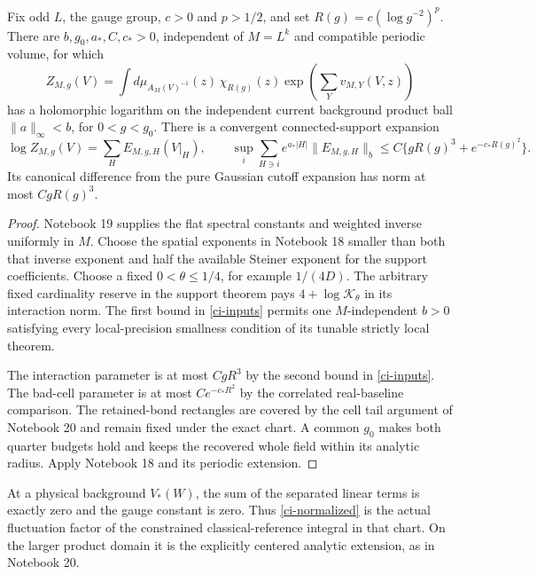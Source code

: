 \begin{theorem}
\label{ci-theorem}
Fix odd $L$, the gauge group, $c>0$ and $p>1/2$, and set
$R(g)=c(\log g^{-2})^p$. There are
$b,g_0,a_*,C,c_*>0$, independent of $M=L^k$ and compatible
periodic volume, for which
\begin{equation}\label{ci-normalized}
 Z_{M,g}(V)=\int d\mu_{A_M(V)^{-1}}(z)\,
       \chi_{R(g)}(z)\exp\left(\sum_Yv_{M,Y}(V,z)\right)
\end{equation}
has a holomorphic logarithm on the independent current
background product ball $\|a\|_\infty<b$, for $0<g<g_0$.
There is a convergent connected-support expansion
\begin{equation}\label{ci-result}
 \log Z_{M,g}(V)=\sum_HE_{M,g,H}(V|_H),\qquad
 \sup_i\sum_{H\ni i}e^{a_*|H|}\|E_{M,g,H}\|_b
       \le C\{gR(g)^3+e^{-c_*R(g)^2}\}.
\end{equation}
Its canonical difference from the pure Gaussian cutoff
expansion has norm at most $CgR(g)^3$.
\end{theorem}
\begin{proof}
Notebook 19 supplies the flat spectral constants and weighted
inverse uniformly in $M$. Choose the spatial exponents in
Notebook 18 smaller than both that inverse exponent and half
the available Steiner exponent for the support coefficients.
Choose a fixed $0<\theta\le1/4$, for example $1/(4D)$.
The arbitrary fixed cardinality reserve in the support
theorem pays $4+\log\mathcal K_\theta$ in its interaction norm.
The first bound in \eqref{ci-inputs} permits one
$M$-independent $b>0$ satisfying every local-precision
smallness condition of its tunable strictly local theorem.

The interaction parameter is at most $CgR^3$ by the second
bound in \eqref{ci-inputs}. The bad-cell parameter is at most
$Ce^{-c_*R^2}$ by the correlated real-baseline comparison.
The retained-bond rectangles are covered by the cell tail
argument of Notebook 20 and remain fixed under the exact
chart. A common $g_0$ makes both quarter budgets hold and
keeps the recovered whole field within its analytic radius.
Apply Notebook 18 and its periodic extension.
\end{proof}

At a physical background $V_*(W)$, the sum of the separated
linear terms is exactly zero and the gauge constant is zero.
Thus \eqref{ci-normalized} is the actual fluctuation factor
of the constrained classical-reference integral in that
chart. On the larger product domain it is the explicitly
centered analytic extension, as in Notebook 20.

